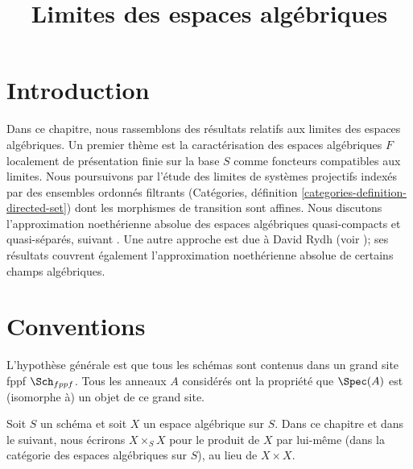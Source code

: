 

%


\title{Limites des espaces algébriques}


\maketitle

\label{section-phantom}

\tableofcontents

\section{Introduction}
\label{section-introduction}

\noindent
Dans ce chapitre, nous rassemblons des résultats relatifs aux limites des espaces algébriques.
Un premier thème est la caractérisation des espaces algébriques $F$ localement
de présentation finie sur la base $S$ comme foncteurs compatibles aux limites.
Nous poursuivons par l'étude des limites de systèmes projectifs indexés par des
ensembles ordonnés filtrants (Catégories, définition \ref{categories-definition-directed-set})
dont les morphismes de transition sont affines. Nous discutons l'approximation
noethérienne absolue des espaces algébriques quasi-compacts et quasi-séparés,
suivant \cite{CLO}. Une autre approche est due à David Rydh (voir
\cite{rydh_approx}); ses résultats couvrent également l'approximation noethérienne
absolue de certains champs algébriques.


\section{Conventions}
\label{section-conventions}

\noindent
L'hypothèse générale est que tous les schémas sont contenus dans
un grand site fppf $\Sch_{fppf}$. Tous les anneaux $A$ considérés
ont la propriété que $\Spec(A)$ est (isomorphe à) un
objet de ce grand site.

\medskip\noindent
Soit $S$ un schéma et soit $X$ un espace algébrique sur $S$.
Dans ce chapitre et dans le suivant, nous écrirons $X \times_S X$
pour le produit de $X$ par lui-même (dans la catégorie des espaces algébriques
sur $S$), au lieu de $X \times X$.











